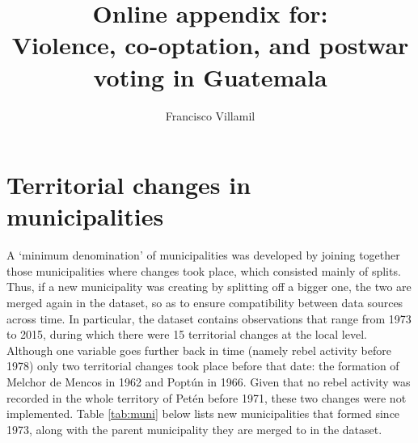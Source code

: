 \documentclass[a4paper, 12pt, notitlepage]{article}
\title{\Large Online appendix for:\\Violence, co-optation, and postwar voting in Guatemala}
\author{Francisco Villamil}
\date{}
\begin{document}
\maketitle

\tableofcontents


\clearpage
\section{Territorial changes in municipalities}\label{app:muni}

A `minimum denomination' of municipalities was developed by joining together those municipalities where changes took place, which consisted mainly of splits.
Thus, if a new municipality was creating by splitting off a bigger one, the two are merged again in the dataset, so as to ensure compatibility between data sources across time.
In particular, the dataset contains observations that range from 1973 to 2015, during which there were 15 territorial changes at the local level.
Although one variable goes further back in time (namely rebel activity before 1978) only two territorial changes took place before that date: the formation of Melchor de Mencos in 1962 and Poptún in 1966.%
Given that no rebel activity was recorded in the whole territory of Petén before 1971, these two changes were not implemented.
Table \ref{tab:muni} below lists new municipalities that formed since 1973, along with the parent municipality they are merged to in the dataset.
\end{document}

